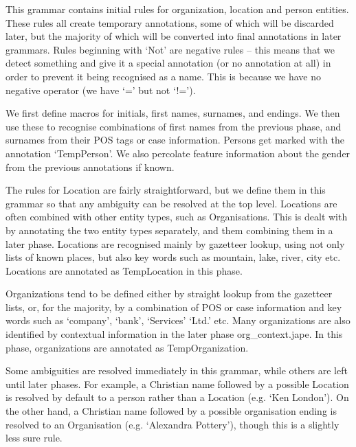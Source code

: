 
This grammar contains initial rules for organization, location and
person entities. These rules all create temporary annotations, some of
which will be discarded later, but the majority of which will be
converted into final annotations in later grammars. Rules beginning
with `Not' are negative rules -- this means that we detect something
and give it a special annotation (or no annotation at all) in order to
prevent it being recognised as a name. This is because we have no
negative operator (we have `=' but not `!=').


We first define macros for initials, first names, surnames, and
endings. We then use these to recognise combinations of first names
from the previous phase, and surnames from their POS tags
or case information. Persons get marked with the
annotation `TempPerson'. We also percolate feature information about
the gender from the previous annotations if known.


The rules for Location are fairly straightforward, but we define them
in this grammar so that any ambiguity can be resolved at the top
level. Locations are often combined with other entity types, such as
Organisations. This is dealt with by annotating the two entity types
separately, and them combining them in a later phase. Locations are
recognised mainly by gazetteer lookup, using not only lists of known
places, but also key words such as mountain, lake, river, city
etc. Locations are annotated as TempLocation in this phase.


Organizations tend to be defined either by straight lookup from
the gazetteer lists, or, for the majority, by a combination of POS or
case information and key words such as `company', `bank',
`Services' `Ltd.' etc. Many organizations are also identified by
contextual information in the later phase org\_context.jape. In this
phase, organizations are annotated as TempOrganization.


Some ambiguities are resolved immediately in this grammar, while
others are left until later phases. For example, a Christian name
followed by a possible Location is resolved by default to a person rather than
a Location (e.g. `Ken London'). On the other hand, a Christian name
followed by a possible organisation ending is resolved to an
Organisation (e.g. `Alexandra Pottery'), though this is a slightly
less sure rule.

